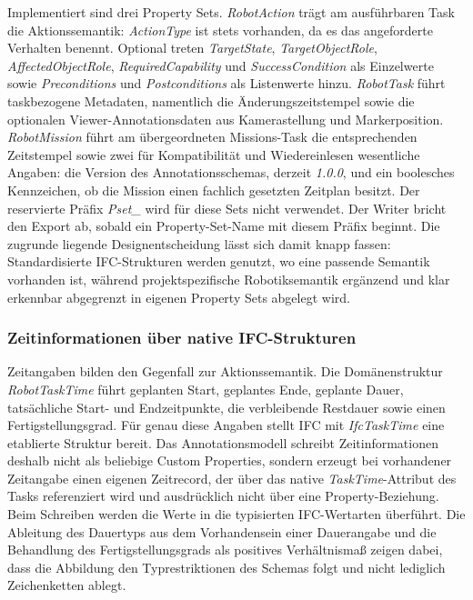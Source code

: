 Implementiert sind drei Property Sets. \textit{RobotAction} trägt am ausführbaren Task die
Aktionssemantik: \textit{ActionType} ist stets vorhanden, da es das angeforderte Verhalten benennt.
Optional treten \textit{TargetState}, \textit{TargetObjectRole}, \textit{AffectedObjectRole},
\textit{RequiredCapability} und \textit{SuccessCondition} als Einzelwerte sowie
\textit{Preconditions} und \textit{Postconditions} als Listenwerte hinzu. \textit{RobotTask} führt
taskbezogene Metadaten, namentlich die Änderungszeitstempel sowie die optionalen
Viewer-Annotationsdaten aus Kamerastellung und Markerposition. \textit{RobotMission} führt am
übergeordneten Missions-Task die entsprechenden Zeitstempel sowie zwei für Kompatibilität und
Wiedereinlesen wesentliche Angaben: die Version des Annotationsschemas, derzeit \textit{1.0.0}, und
ein boolesches Kennzeichen, ob die Mission einen fachlich gesetzten Zeitplan besitzt. Der
reservierte Präfix \textit{Pset\_} wird für diese Sets nicht verwendet. Der Writer bricht den Export
ab, sobald ein Property-Set-Name mit diesem Präfix beginnt. Die zugrunde liegende Designentscheidung
lässt sich damit knapp fassen: Standardisierte IFC-Strukturen werden genutzt, wo eine passende
Semantik vorhanden ist, während projektspezifische Robotiksemantik ergänzend und klar erkennbar
abgegrenzt in eigenen Property Sets abgelegt wird.

\subsubsection{Zeitinformationen über native IFC-Strukturen}
Zeitangaben bilden den Gegenfall zur Aktionssemantik. Die Domänenstruktur \textit{RobotTaskTime}
führt geplanten Start, geplantes Ende, geplante Dauer, tatsächliche Start- und Endzeitpunkte, die
verbleibende Restdauer sowie einen Fertigstellungsgrad. Für genau diese Angaben stellt IFC mit
\textit{IfcTaskTime} eine etablierte Struktur bereit. Das Annotationsmodell schreibt
Zeitinformationen deshalb nicht als beliebige Custom Properties, sondern erzeugt bei vorhandener
Zeitangabe einen eigenen Zeitrecord, der über das native \textit{TaskTime}-Attribut des Tasks
referenziert wird und ausdrücklich nicht über eine Property-Beziehung. Beim Schreiben werden die
Werte in die typisierten IFC-Wertarten überführt. Die Ableitung des Dauertyps aus dem Vorhandensein
einer Dauerangabe und die Behandlung des Fertigstellungsgrads als positives Verhältnismaß zeigen
dabei, dass die Abbildung den Typrestriktionen des Schemas folgt und nicht lediglich Zeichenketten
ablegt.

